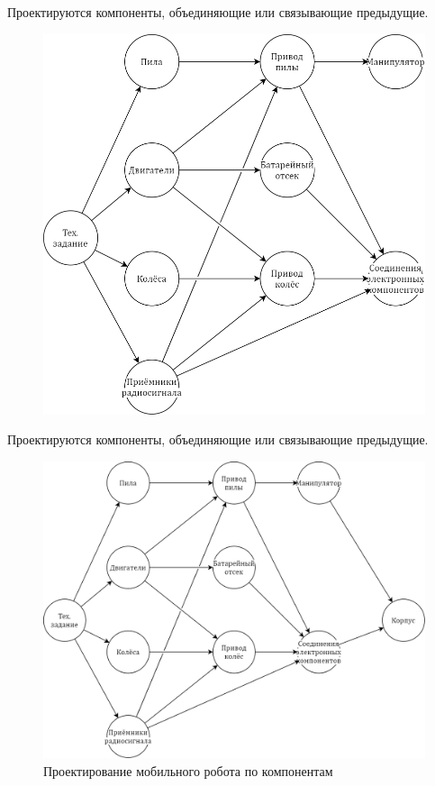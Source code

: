 \begin{frame} 
  Проектируются компоненты, объединяющие или связывающие предыдущие.
  \begin{figure}[!ht]
    \centering
    \includegraphics[scale=0.2]{images/design.frame04.png}
    \label{fig:desginFrame04}
  \end{figure}
\end{frame}
\begin{frame} 
  Проектируются компоненты, объединяющие или связывающие предыдущие.
  \begin{figure}[!ht]
    \centering
    \includegraphics[scale=0.2]{images/design.frame05.png}
    \caption{Проектирование мобильного робота по компонентам}
    \label{fig:desginFrame05}
  \end{figure}
\end{frame}
